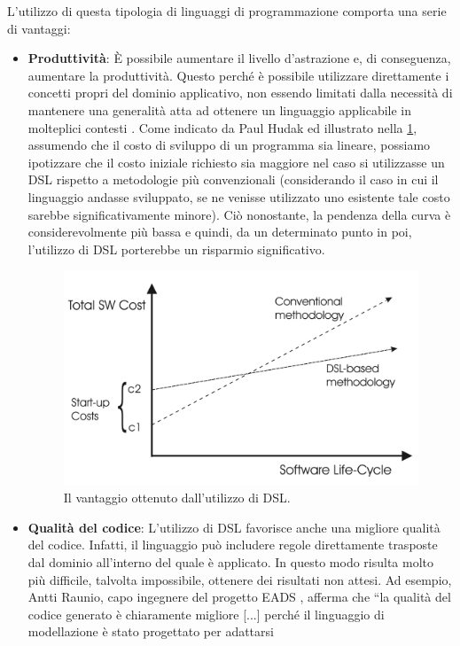 \documentclass[12pt,a4paper,openright,twoside]{book}
\begin{document}
L’utilizzo di questa tipologia di linguaggi di programmazione comporta una serie di vantaggi:
\begin{itemize}
    \item \textbf{Produttività}: È possibile aumentare il livello d’astrazione e, di conseguenza, aumentare la produttività. Questo perché è 
    possibile utilizzare direttamente i concetti propri del dominio applicativo, non essendo limitati dalla necessità di mantenere una 
    generalità atta ad ottenere un linguaggio applicabile in molteplici contesti  \cite{Kelly2008}. Come indicato da Paul Hudak 
    \cite{Hudak1997} ed illustrato nella \cref{fig:sw-dev-cost}, assumendo che il costo di sviluppo di un programma sia lineare, possiamo 
    ipotizzare che il costo iniziale richiesto sia maggiore nel caso si utilizzasse un \ac{DSL} rispetto a metodologie più convenzionali 
    (considerando il caso in cui il linguaggio andasse sviluppato, se ne venisse utilizzato uno esistente tale costo sarebbe significativamente 
    minore). Ciò nonostante, la pendenza della curva è considerevolmente più bassa e quindi, da un determinato punto in poi, l’utilizzo di 
    \ac{DSL} porterebbe un risparmio significativo.
    \begin{figure}
        \centering
        \includegraphics[width=.7\linewidth]{figures/sw-dev-cost.pdf}
        \caption{Il vantaggio ottenuto dall'utilizzo di DSL.}
        \label{fig:sw-dev-cost}
    \end{figure}
    \item \textbf{Qualità del codice}: L'utilizzo di \ac{DSL} favorisce anche una migliore qualità del codice. Infatti, il linguaggio può 
    includere regole direttamente trasposte dal dominio all'interno del quale è applicato. In questo modo risulta molto più difficile, talvolta 
    impossibile, ottenere dei risultati non attesi. Ad esempio, Antti Raunio, capo ingegnere del progetto EADS \cite{EADS}, afferma che ``la 
    qualità del codice generato è chiaramente migliore [...] perché il linguaggio di modellazione è stato progettato per adattarsi 

\end{itemize}
\end{document}
